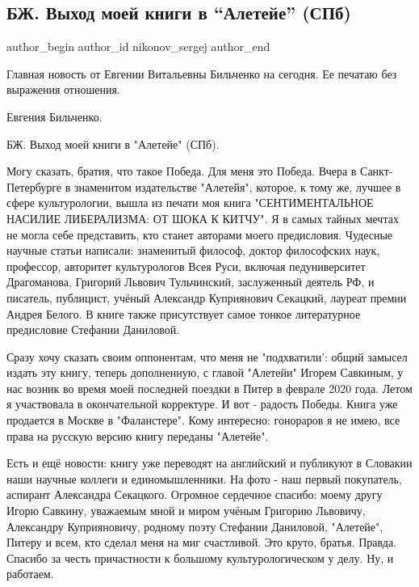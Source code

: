  
 
 
 
 
 
\subsection{БЖ. Выход моей книги в \enquote{Алетейе} (СПб)}
\label{sec:04_09_2021.fb.nikonov_sergej.1.bilchenko_kniga}
 
\ifcmt
 author_begin
   author_id nikonov_sergej
 author_end
\fi

Главная новость от Евгении Витальевны Бильченко на сегодня. Ее печатаю без выражения отношения. 

Евгения Бильченко.

БЖ. Выход моей книги в "Алетейе" (СПб).


Могу сказать, братия, что такое Победа. Для меня это Победа. Вчера в
Санкт-Петербурге в знаменитом издательстве "Алетейя", которое, к тому же,
лучшее в сфере культурологии, вышла из печати моя книга "СЕНТИМЕНТАЛЬНОЕ
НАСИЛИЕ ЛИБЕРАЛИЗМА: ОТ ШОКА К КИТЧУ". Я в самых тайных мечтах не могла себе
представить, кто станет авторами моего предисловия. Чудесные научные статьи
написали: знаменитый философ, доктор философских наук, профессор, авторитет
культурологов Всея Руси, включая педуниверситет Драгоманова, Григорий Львович
Тульчинский, заслуженный деятель РФ, и писатель, публицист, учёный Александр
Куприянович Секацкий, лауреат премии Андрея Белого. В книге также присутствует
самое тонкое литературное предисловие Стефании Даниловой.

Сразу хочу сказать своим оппонентам, что меня не "подхватили': общий замысел
издать эту книгу, теперь дополненную, с главой "Алетейи" Игорем Савкиным, у нас
возник во время моей последней поездки в Питер в феврале 2020 года. Летом я
участвовала в окончательной корректуре. И вот - радость Победы. Книга уже
продается в Москве в "Фаланстере". Кому интересно: гонораров я не имею, все
права на русскую версию книгу переданы "Алетейе".

Есть и ещё новости: книгу уже переводят на английский и публикуют в Словакии
наши научные коллеги и единомышленники. На фото - наш первый покупатель,
аспирант Александра Секацкого. Огромное сердечное спасибо: моему другу Игорю
Савкину, уважаемым мной и миром учёным Григорию Львовичу, Александру
Куприяновичу, родному поэту Стефании Даниловой, "Алетейе", Питеру и всем, кто
сделал меня на миг счастливой. Это круто, братья. Правда. Спасибо за честь
причастности к большому культурологическом у делу. Ну, и работаем.

